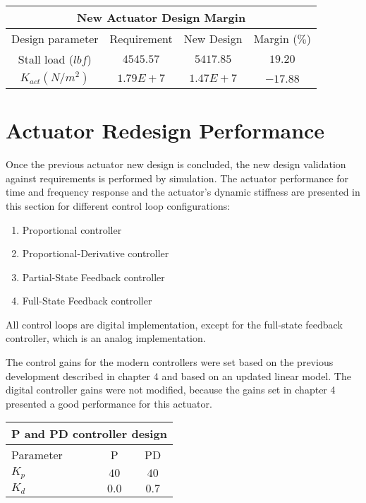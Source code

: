 \begin{table}[H]
    \label{table:Final_Newmargin}
	\centering
    \begin{tabular}{|c|c|c|c|}
    \hline
    \multicolumn{4}{|c|}{New Actuator Design Margin} \\ \hline
    Design parameter & Requirement & New Design & Margin ($\%$) \\ \hline
    Stall load ($lbf$) & $4545.57$ & $5417.85$ & $19.20$ \\ \hline
    $K_{act}(N/m^2)$ & $1.79 E+7$  & $1.47 E+7$ & $-17.88$ \\ \hline
    \end{tabular}

\end{table}

\section{Actuator Redesign Performance}

Once the previous actuator new design is concluded, the new design validation against requirements is performed by simulation. The actuator performance for time and frequency response and the actuator's dynamic stiffness are presented in this section for different control loop configurations:
\begin{enumerate}[i]
\item Proportional controller 
\item Proportional-Derivative controller 
\item Partial-State Feedback controller 
\item Full-State Feedback controller 
\end{enumerate}

All control loops are digital implementation, except for the full-state feedback controller, which is an analog implementation.

The control gains for the modern controllers were set based on the previous development described in chapter 4 and based on an updated linear model. The digital controller gains were not modified, because the gains set in chapter 4 presented a good performance for this actuator.

\begin{table}[H]
    \label{table:pid_tested2}
	\centering
	\resizebox{6cm}{!} {
    \begin{tabular}{|l|c|c|}
    \hline
    \multicolumn{3}{|c|}{P and PD controller design} \\ \hline
    Parameter & P & PD \\ \hline
    $K_p$ & $ 40 $ & $40$ \\ \hline
    $K_d$ & $0.0$ & $0.7$ \\ \hline
    \end{tabular}}

\end{table}

